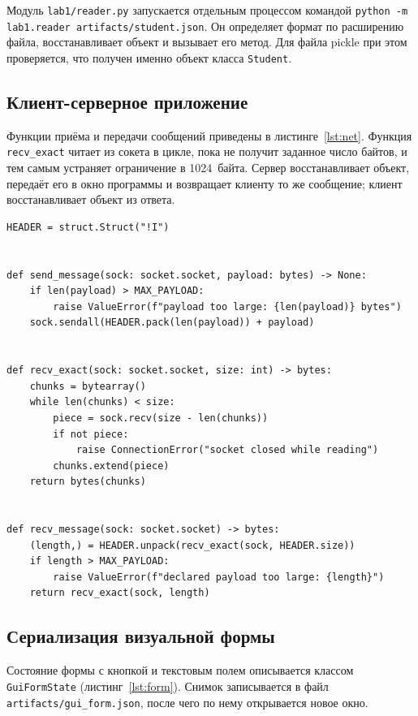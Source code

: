 \documentclass[14pt,a4paper]{extarticle}
\begin{document}
Модуль \texttt{lab1/reader.py} запускается отдельным процессом командой
\texttt{python -m lab1.reader artifacts/student.json}. Он определяет формат по
расширению файла, восстанавливает объект и вызывает его метод. Для файла pickle при
этом проверяется, что получен именно объект класса \texttt{Student}.

\subsection{Клиент-серверное приложение}

Функции приёма и передачи сообщений приведены в листинге~\ref{lst:net}. Функция
\texttt{recv\_exact} читает из сокета в цикле, пока не получит заданное число байтов,
и тем самым устраняет ограничение в 1024~байта. Сервер восстанавливает объект,
передаёт его в окно программы и возвращает клиенту то же сообщение; клиент
восстанавливает объект из ответа.

\begin{lstlisting}[style=python, caption={Сообщения с указанием длины}, label={lst:net}]
HEADER = struct.Struct("!I")


def send_message(sock: socket.socket, payload: bytes) -> None:
    if len(payload) > MAX_PAYLOAD:
        raise ValueError(f"payload too large: {len(payload)} bytes")
    sock.sendall(HEADER.pack(len(payload)) + payload)


def recv_exact(sock: socket.socket, size: int) -> bytes:
    chunks = bytearray()
    while len(chunks) < size:
        piece = sock.recv(size - len(chunks))
        if not piece:
            raise ConnectionError("socket closed while reading")
        chunks.extend(piece)
    return bytes(chunks)


def recv_message(sock: socket.socket) -> bytes:
    (length,) = HEADER.unpack(recv_exact(sock, HEADER.size))
    if length > MAX_PAYLOAD:
        raise ValueError(f"declared payload too large: {length}")
    return recv_exact(sock, length)
\end{lstlisting}

\subsection{Сериализация визуальной формы}

Состояние формы с кнопкой и текстовым полем описывается классом
\texttt{GuiFormState} (листинг~\ref{lst:form}). Снимок записывается в файл
\texttt{artifacts/gui\_form.json}, после чего по нему открывается новое окно.
\end{document}
